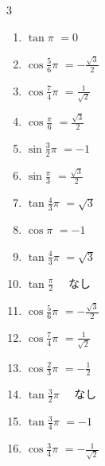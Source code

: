 \begin{multicols}{3}
\begin{enumerate}
  \item $\displaystyle \tan{\pi}$
        $\displaystyle =0$

  \item $\displaystyle \cos{\frac{5}{6}\pi}$
        $\displaystyle =-\frac{\sqrt{3}}{2}$

  \item $\displaystyle \cos{\frac{7}{4}\pi}$
        $\displaystyle =\frac{1}{\sqrt{2}}$

  \item $\displaystyle \cos{\frac{\pi}{6}}$
        $\displaystyle =\frac{\sqrt{3}}{2}$

  \item $\displaystyle \sin{\frac{3}{2}\pi}$
        $\displaystyle =-1$

  \item $\displaystyle \sin{\frac{\pi}{3}}$
        $\displaystyle =\frac{\sqrt{3}}{2}$

  \item $\displaystyle \tan{\frac{4}{3}\pi}$
        $\displaystyle =\sqrt{3}$

  \item $\displaystyle \cos{\pi}$
        $\displaystyle =-1$

  \item $\displaystyle \tan{\frac{4}{3}\pi}$
        $\displaystyle =\sqrt{3}$

  \item $\displaystyle \tan{\frac{\pi}{2}}$
        $\displaystyle \quad なし$

\columnbreak %

  \item $\displaystyle \cos{\frac{5}{6}\pi}$
        $\displaystyle =-\frac{\sqrt{3}}{2}$

  \item $\displaystyle \cos{\frac{7}{4}\pi}$
        $\displaystyle =\frac{1}{\sqrt{2}}$

  \item $\displaystyle \cos{\frac{2}{3}\pi}$
        $\displaystyle =-\frac{1}{2}$

  \item $\displaystyle \tan{\frac{3}{2}\pi}$
        $\displaystyle \quad なし$

  \item $\displaystyle \tan{\frac{3}{4}\pi}$
        $\displaystyle =-1$

  \item $\displaystyle \cos{\frac{3}{4}\pi}$
        $\displaystyle =-\frac{1}{\sqrt{2}}$


\end{enumerate}
\end{multicols}
